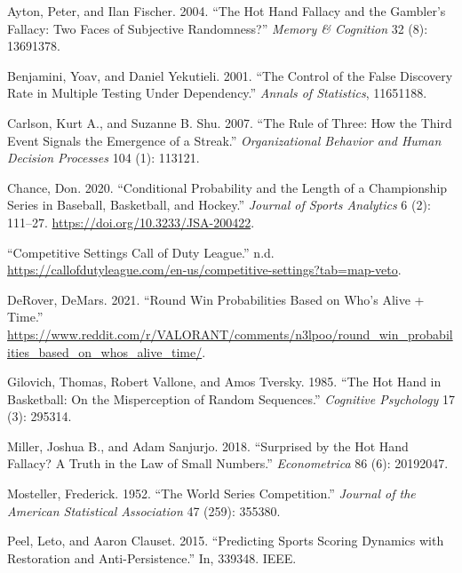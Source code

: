 \documentclass{article}
\newlength{\cslhangindent}
\newlength{\cslentryspacingunit} %
\newenvironment{CSLReferences}[2] %
 {%
  \setlength{\parindent}{0pt}
  \ifodd #1
  \let\oldpar\par
  \def\par{\hangindent=\cslhangindent\oldpar}
  \fi
  \setlength{\parskip}{#2\cslentryspacingunit}
 }%
 {}
\begin{document}
\hypertarget{refs}{}
\begin{CSLReferences}{1}{0}
\leavevmode{}%
Ayton, Peter, and Ilan Fischer. 2004. {``The Hot Hand Fallacy and the
Gambler{'}s Fallacy: Two Faces of Subjective Randomness?''} \emph{Memory
\& Cognition} 32 (8): 13691378.

\leavevmode{}%
Benjamini, Yoav, and Daniel Yekutieli. 2001. {``The Control of the False
Discovery Rate in Multiple Testing Under Dependency.''} \emph{Annals of
Statistics}, 11651188.

\leavevmode{}%
Carlson, Kurt A., and Suzanne B. Shu. 2007. {``The Rule of Three: How
the Third Event Signals the Emergence of a Streak.''}
\emph{Organizational Behavior and Human Decision Processes} 104 (1):
113121.

\leavevmode{}%
Chance, Don. 2020. {``Conditional Probability and the Length of a
Championship Series in Baseball, Basketball, and Hockey.''}
\emph{Journal of Sports Analytics} 6 (2): 111--27.
\url{https://doi.org/10.3233/JSA-200422}.

\leavevmode{}%
{``Competitive Settings \textbar{} Call of Duty League.''} n.d.
\url{https://callofdutyleague.com/en-us/competitive-settings?tab=map-veto}.

\leavevmode{}%
DeRover, DeMars. 2021. {``Round Win Probabilities Based on Who's Alive +
Time.''}
\url{https://www.reddit.com/r/VALORANT/comments/n3lpoo/round_win_probabilities_based_on_whos_alive_time/}.

\leavevmode{}%
Gilovich, Thomas, Robert Vallone, and Amos Tversky. 1985. {``The Hot
Hand in Basketball: On the Misperception of Random Sequences.''}
\emph{Cognitive Psychology} 17 (3): 295314.

\leavevmode{}%
Miller, Joshua B., and Adam Sanjurjo. 2018. {``Surprised by the Hot Hand
Fallacy? A Truth in the Law of Small Numbers.''} \emph{Econometrica} 86
(6): 20192047.

\leavevmode{}%
Mosteller, Frederick. 1952. {``The World Series Competition.''}
\emph{Journal of the American Statistical Association} 47 (259): 355380.

\leavevmode{}%
Peel, Leto, and Aaron Clauset. 2015. {``Predicting Sports Scoring
Dynamics with Restoration and Anti-Persistence.''} In, 339348. IEEE.


\end{CSLReferences}
\end{document}
